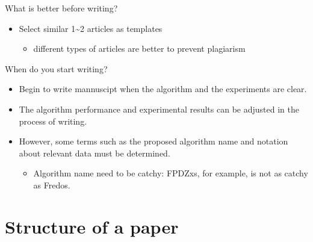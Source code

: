 \documentclass[
 size=14pt,
 paper=smartboard,  %
 mode=present, 		%
 display=slides, 	%
 style=tuliplab,  	%
 pauseslide,
 fleqn,leqno]{powerdot}{}
\begin{document}

\begin{slide}[toc=,bm=]{What is better before writing?}
	\begin{itemize}
		\item Select similar 1\~{}2 articles as templates 
			\begin{itemize}
				\item different types of articles are better to prevent plagiarism
			\end{itemize}	
	\end{itemize}	
\end{slide}


\begin{slide}[toc=,bm=]{When do you start writing?}
	\begin{itemize}
		\item Begin to write mannuscipt when the algorithm and the experiments are clear. 
		\item The algorithm performance and experimental results can be adjusted in the process of writing.
		\item However, some terms such as the proposed algorithm name and notation about relevant data must be determined.
			\begin{itemize}
				\item Algorithm name need to be catchy: FPDZxs, for example, is not as catchy as Fredos.
			\end{itemize}		
	\end{itemize}	
\end{slide}


\section{Structure of a paper}

\end{document}
